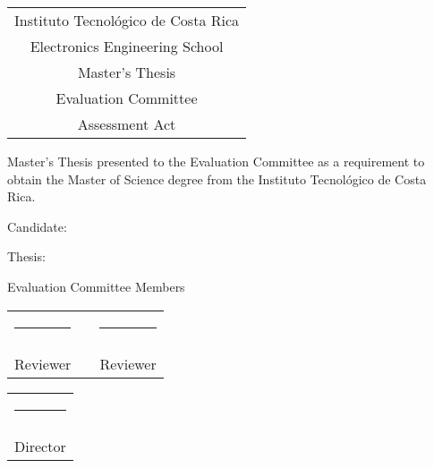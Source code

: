 

\thispagestyle{empty}


\begin{center}
  \begin{tabular}{c}
    Instituto Tecnológico de Costa Rica \\
    Electronics Engineering School \\
    Master's Thesis \\
    Evaluation Committee \\
    Assessment Act
  \end{tabular}
\end{center}

\vfill

Master's Thesis presented to the Evaluation Committee as a requirement to
obtain the Master of Science degree from the Instituto Tecnológico de Costa 
Rica.

\vspace*{15mm}

\begin{center}
  Candidate: \scriptAuthor
\end{center}

\vfill

\begin{center}
  Thesis: \textit{\scriptTitle}
\end{center}

\vspace*{10mm}
\begin{center}
 Evaluation Committee Members
\end{center}
\vspace*{1mm}

\vfill

\begin{center}
	\begin{tabular}{ccc}
		\rule{70mm}{0.5pt} & \rule{15mm}{0pt} & \rule{70mm}{0.5pt} \\
		\lectorI && \lectorII \\
		Reviewer && Reviewer
	\end{tabular}
	
	\vspace{10mm}
	
	\begin{tabular}{c}
		\rule{6cm}{0.5pt} \\
		\director \\
		Director
	\end{tabular}
\end{center}

